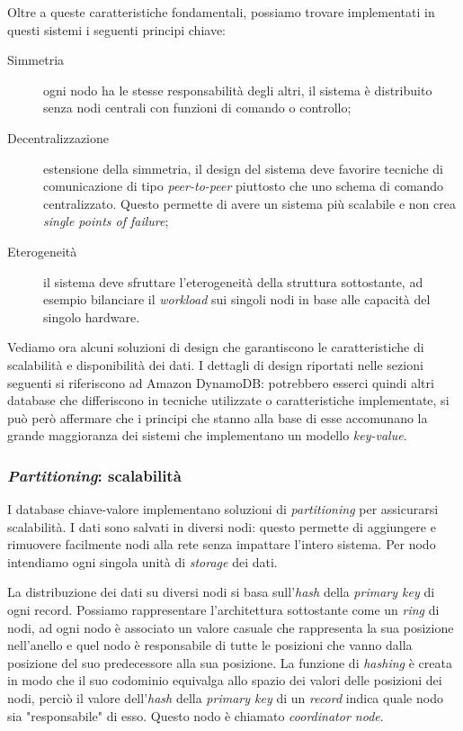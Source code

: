 Oltre a queste caratteristiche fondamentali, possiamo trovare implementati in questi sistemi i seguenti principi chiave:

\begin{description}
\item [Simmetria] ogni nodo ha le stesse responsabilità degli altri, il sistema è distribuito senza nodi centrali con funzioni di comando o controllo;
\item [Decentralizzazione] estensione della simmetria, il design del sistema deve favorire tecniche di comunicazione di tipo \textit{peer-to-peer} piuttosto che uno schema di comando centralizzato. Questo permette di avere un sistema più scalabile e non crea \textit{single points of failure};
\item [Eterogeneità] il sistema deve sfruttare l'eterogeneità della struttura sottostante, ad esempio bilanciare il \textit{workload} sui singoli nodi in base alle capacità del singolo hardware.
\end{description}

Vediamo ora alcuni soluzioni di design che garantiscono le caratteristiche di scalabilità e disponibilità dei dati. I dettagli di design riportati nelle sezioni seguenti si riferiscono ad Amazon DynamoDB: potrebbero esserci quindi altri database che differiscono in tecniche utilizzate o caratteristiche implementate, si può però affermare che i principi che stanno alla base di esse accomunano la grande maggioranza dei sistemi che implementano un modello \textit{key-value}.


\subsubsection{\textit{Partitioning}: scalabilità}\label{part}
I database chiave-valore implementano soluzioni di \textit{partitioning} per assicurarsi scalabilità. I dati sono salvati in diversi nodi: questo permette di aggiungere e rimuovere facilmente nodi alla rete senza impattare l'intero sistema. Per nodo intendiamo ogni singola unità di \textit{storage} dei dati.

La distribuzione dei dati su diversi nodi si basa sull'\textit{hash} della \textit{primary key} di ogni record. Possiamo rappresentare l'architettura sottostante come un \textit{ring} di nodi, ad ogni nodo è associato un valore casuale che rappresenta la sua posizione nell'anello e quel nodo è responsabile di tutte le posizioni che vanno dalla posizione del suo predecessore alla sua posizione. La funzione di \textit{hashing} è creata in modo che il suo codominio equivalga allo spazio dei valori delle posizioni dei nodi, perciò il valore dell'\textit{hash} della \textit{primary key} di un \textit{record} indica quale nodo sia "responsabile" di esso. Questo nodo è chiamato \textit{coordinator node}.


